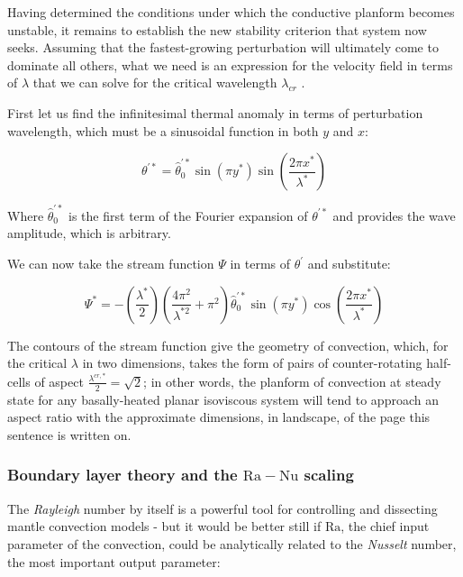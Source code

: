 \documentclass[a4paper,11pt,oneside]{book}
\begin{document}
Having determined the conditions under which the conductive planform becomes unstable, it remains to establish the new stability criterion that system now seeks. Assuming that the fastest-growing perturbation will ultimately come to dominate all others, what we need is an expression for the velocity field in terms of $\lambda$ that we can solve for the critical wavelength $\lambda_{cr}$ \cite{Rayleigh1916-il}.

First let us find the infinitesimal thermal anomaly in terms of perturbation wavelength, which must be a sinusoidal function in both $y$ and $x$:

\begin{equation}
\theta^{'*} = \widehat{\theta}_0^{'*} \sin \left( \pi y^* \right) \sin \left( \frac{2 \pi x^*}{\lambda^*} \right)
\end{equation}

Where $\widehat{\theta}_0^{'*}$ is the first term of the Fourier expansion of $\theta^{'*}$ and provides the wave amplitude, which is arbitrary.

We can now take the stream function $\Psi$ in terms of $\theta^{'}$ and substitute:

\begin{equation}
\Psi^* = - \left( \frac{\lambda^*}{2} \right) \left( \frac{4\pi^2}{\lambda^{*2}} + \pi^2 \right) \widehat{\theta}_0^{'*} \sin \left( \pi y^* \right) \cos \left( \frac{2 \pi x^*}{\lambda^*} \right)
\end{equation}

The contours of the stream function give the geometry of convection, which, for the critical $\lambda$ in two dimensions, takes the form of pairs of counter-rotating half-cells of aspect $\frac{\lambda^{cr, *}}{2}=\sqrt{2}$; in other words, the planform of convection at steady state for any basally-heated planar isoviscous system will tend to approach an aspect ratio with the approximate dimensions, in landscape, of the page this sentence is written on.

\subsubsection{Boundary layer theory and the $\mathrm{Ra} -\mathrm{Nu}$ scaling}

The \textit{Rayleigh} number by itself is a powerful tool for controlling and dissecting mantle convection models - but it would be better still if $\mathrm{Ra}$, the chief input parameter of the convection, could be analytically related to the \textit{Nusselt} number, the most important output parameter:
\end{document}
